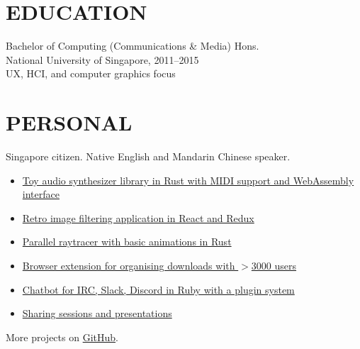 \documentclass[line, margin]{res}
\begin{document}
\begin{resume}


    \section{EDUCATION}
        Bachelor of Computing (Communications \& Media) Hons. \\
        National University of Singapore, 2011--2015 \\
        UX, HCI, and computer graphics focus

    \section{PERSONAL}
        Singapore citizen. Native English and Mandarin Chinese speaker.
        \\
        \begin{itemize}[leftmargin=*]
        \itemsep0em 
        \item \href{https://github.com/gyng/synthrs}{Toy audio synthesizer library in Rust with MIDI support and WebAssembly interface}
        \item \href{https://github.com/gyng/ditherer}{Retro image filtering application in React and Redux}
        \item \href{https://github.com/gyng/rust-raytracer}{Parallel raytracer with basic animations in Rust}
        \item \href{https://github.com/gyng/save-in}{Browser extension for organising downloads with $>$3000 users}
        \item \href{https://github.com/gyng/betabot}{Chatbot for IRC, Slack, Discord in Ruby with a plugin system}
        \item \href{https://github.com/gyng/book}{Sharing sessions and presentations}
        \end{itemize}
        More projects on \href{https://github.com/gyng}{GitHub}.


\end{resume}
\end{document}
